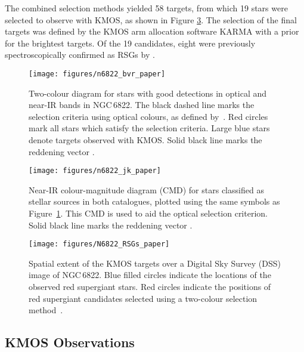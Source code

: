 \documentclass[iop]{emulateapj}
\begin{document}
The combined selection methods yielded 58 targets, from which 19 stars were selected to observe with KMOS, as shown in Figure
\ref{fig:N6822}.
The selection of the final targets was defined by the KMOS arm allocation software {\sc KARMA} with a prior for the brightest targets.
Of the 19 candidates, eight were previously spectroscopically confirmed as RSGs by
\cite{Levesque12}.


\begin{figure}
 \texttt{[image: figures/n6822\_bvr\_paper]}
 \caption{
          Two-colour diagram for stars with good detections in optical and near-IR bands in NGC\,6822.
          The black dashed line marks the selection criteria using optical colours, as defined by~\protect\cite{Levesque12}.
          Red circles mark all stars which satisfy the selection criteria.
          Large blue stars denote targets observed with KMOS.
          Solid black line marks the reddening vector
          \protect\citep{1998ApJ...500..525S}.
         }
 \label{fig:BVR}
\end{figure}

\begin{figure}
 \texttt{[image: figures/n6822\_jk\_paper]}
 \caption{
          Near-IR colour-magnitude diagram (CMD) for stars classified as stellar sources in both catalogues, plotted using the same symbols as Figure~\ref{fig:BVR}.
          This CMD is used to aid the optical selection criterion.
          Solid black line marks the reddening vector
          \protect\citep{1998ApJ...500..525S}.
         }
 \label{fig:JK}
\end{figure}


\begin{figure}
 \texttt{[image: figures/N6822\_RSGs\_paper]}
 \caption{Spatial extent of the KMOS targets over a Digital Sky Survey (DSS) image of NGC\,6822.
          Blue filled circles indicate the locations of the observed red supergiant stars.
          Red circles indicate the positions of red supergiant candidates selected using a two-colour selection method~\citep{Levesque12}.
          }
 \label{fig:N6822}
\end{figure}


\subsection{KMOS Observations} %
\label{sub:observations}
\end{document}
